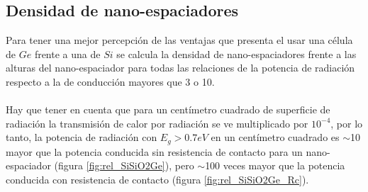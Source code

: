\subsection{Densidad de nano-espaciadores}
Para tener una mejor percepción de las ventajas que presenta el usar una célula de $Ge$ frente a una de $Si$ se calcula la densidad de nano-espaciadores frente a las alturas del nano-espaciador para todas las relaciones de la potencia de radiación respecto a la de conducción mayores que 3 o 10.\\\\
Hay que tener en cuenta que para un centímetro cuadrado de superficie de radiación la transmisión de calor por radiación se ve multiplicado por $10^{-4}$, por lo tanto, la potencia de radiación con $E_g>0.7eV$ en un centímetro cuadrado es $\sim$10 mayor que la potencia conducida sin resistencia de contacto para un nano-espaciador (figura \ref{fig:rel_SiSiO2Ge}), pero $\sim$100 veces mayor que la potencia conducida con resistencia de contacto (figura \ref{fig:rel_SiSiO2Ge_Rc}).
